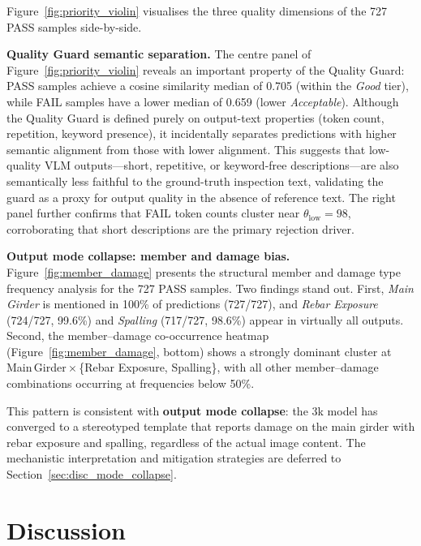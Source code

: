 \documentclass[twocolumn]{article}
\begin{document}
Figure~\ref{fig:priority_violin} visualises the three quality dimensions
of the 727 PASS samples side-by-side.

\textbf{Quality Guard semantic separation.}
The centre panel of Figure~\ref{fig:priority_violin} reveals an important
property of the Quality Guard: PASS samples achieve a cosine similarity
median of 0.705 (within the \textit{Good} tier), while FAIL samples have a
lower median of 0.659 (lower \textit{Acceptable}).
Although the Quality Guard is defined purely on output-text properties
(token count, repetition, keyword presence), it incidentally separates
predictions with higher semantic alignment from those with lower alignment.
This suggests that low-quality VLM outputs---short, repetitive, or
keyword-free descriptions---are also semantically less faithful to the
ground-truth inspection text, validating the guard as a proxy for
output quality in the absence of reference text.
The right panel further confirms that FAIL token counts cluster near
$\theta_{\text{low}}=98$, corroborating that short descriptions are the
primary rejection driver.

\textbf{Output mode collapse: member and damage bias.}
Figure~\ref{fig:member_damage} presents the structural member and damage
type frequency analysis for the 727 PASS samples.
Two findings stand out.
First, \textit{Main Girder} is mentioned in 100\% of predictions (727/727),
and \textit{Rebar Exposure} (724/727, 99.6\%) and \textit{Spalling}
(717/727, 98.6\%) appear in virtually all outputs.
Second, the member--damage co-occurrence heatmap (Figure~\ref{fig:member_damage},
bottom) shows a strongly dominant cluster at
Main\,Girder\,$\times$\,\{Rebar Exposure, Spalling\}, with all other
member--damage combinations occurring at frequencies below 50\%.

This pattern is consistent with \textbf{output mode collapse}: the 3k model
has converged to a stereotyped template that reports damage on the main girder
with rebar exposure and spalling, regardless of the actual image content.
The mechanistic interpretation and mitigation strategies are deferred to
Section~\ref{sec:disc_mode_collapse}.

\FloatBarrier

\section{Discussion}
\label{sec:discussion}
\end{document}
